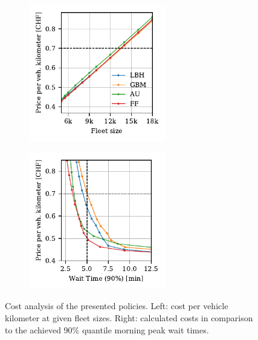 
\begin{figure}
\centering
\begin{subfigure}{0.5\textwidth}
  \centering
  \includegraphics[width=2.35in]{figures/revision/rev_price.pdf}
\end{subfigure}%
\begin{subfigure}{0.5\textwidth}
  \centering
  \includegraphics[width=2.35in]{figures/revision/rev_price_vs_waiting_time.pdf}
\end{subfigure}
\caption{Cost analysis of the presented policies. Left: cost per vehicle kilometer at given fleet sizes. Right: calculated costs in comparison to the achieved 90\% quantile morning peak wait times.}
\label{fig:financial}
\end{figure}




